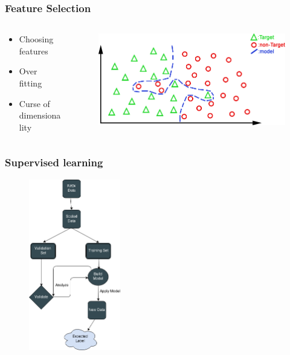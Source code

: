 \documentclass{beamer}
\begin{document}
\begin{frame}
\frametitle{Feature Selection}

	\begin{columns}[T]
    \begin{column}{.5\textwidth}

	\begin{itemize}
		\item Choosing features
		\item Over fitting 
		\item Curse of dimensionality
	\end{itemize}
	
	\end{column}	
	\begin{column}{.5\textwidth}
	
	\begin{figure}
		\includegraphics[width=\textwidth]{./img/overfit2.png}
	\end{figure}

	\end{column}	
	\end{columns}
	
\end{frame}

\begin{frame}
\frametitle{Supervised learning}

	\begin{figure}
		\centering
    	\includegraphics[width=40mm,scale=1]{./img/SL.png}
	\end{figure}

\end{frame}
\end{document}
